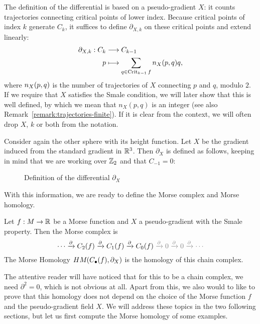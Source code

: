 The definition of the differential is based on a pseudo-gradient $X$: it counts trajectories connecting critical points of lower index.
Because critical points of index $k$ generate $C_k$, it suffices to define $\partial_{X,k}$ on these critical points and extend linearly:
\begin{align*}
    \partial_{X, k}: C_k &\longrightarrow C_{k-1} \\
    p &\longmapsto \sum_{q \in \operatorname{Crit}_{k-1} f} n_{X}(p, q) q
,\end{align*}
where $n_{X}(p, q)$ is the number of trajectories of $X$ connecting $p$ and $q$, modulo $2$.
If we require that $X$ satisfies the Smale condition, we will later show that this is well defined, by which we mean that $n_X(p,q)$ is an integer (see also Remark~\ref{remark:trajectories-finite}).
If it is clear from the context, we will often drop $X$, $k$ or both from the notation.
\begin{eg}
    Consider again the other sphere with its height function.
    Let $X$ be the gradient induced from the standard gradient in $\mathbb{R}^3$.
    Then $\partial_X$ is defined as follows, keeping in mind that we are working over $\mathbb{Z}_2$ and that $C_{-1} = 0$:
\begin{figure}[H]
    \centering
    \caption{Definition of the differential $\partial_X$}
    \label{fig:morse-homology-other-sphere-differential}
\end{figure}
\end{eg}

With this information, we are ready to define the Morse complex and Morse homology.
\begin{definition}
    Let $f:M \to \mathbb{R}$ be a Morse function and $X$ a pseudo-gradient with the Smale property.
    Then the Morse complex is 
    \[
        \cdots \xrightarrow{\partial} C_2(f) \xrightarrow{\partial}  C_1(f) \xrightarrow{\partial} C_0(f) \textcolor{gray}{{} \xrightarrow{\partial}  0 \xrightarrow{\partial }0 \xrightarrow{\partial}  \cdots}
    \] 
    The Morse Homology $HM_{}(C_\bullet(f), \partial_X)$ is the homology of this chain complex.
\end{definition}
The attentive reader will have noticed that for this to be a chain complex, we need $\partial^2 = 0$, which is not obvious at all.
Apart from this, we also would to like to prove that  this homology does not depend on the choice of the Morse function $f$ and the pseudo-gradient field $X$.
We will address these topics in the two following sections, but let us first compute the Morse homology of some examples.


